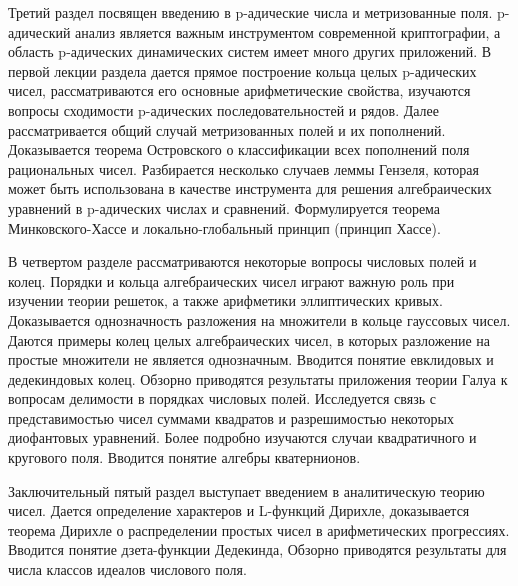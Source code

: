 \documentclass[a4paper, 12pt]{article}
\begin{document}
Третий раздел посвящен введению в p-адические числа и метризованные поля. p-адический анализ является важным инструментом современной криптографии, а область p-адических динамических систем имеет много других приложений. В первой лекции раздела дается прямое построение кольца целых p-адических чисел, рассматриваются его основные арифметические свойства, изучаются вопросы сходимости p-адических последовательностей и рядов. Далее рассматривается общий случай метризованных полей и их пополнений. Доказывается теорема Островского о классификации всех пополнений поля рациональных чисел. Разбирается несколько случаев леммы Гензеля, которая может быть использована в качестве инструмента для решения алгебраических уравнений в p-адических числах и сравнений. Формулируется теорема Минковского-Хассе и локально-глобальный принцип (принцип Хассе).

В четвертом разделе рассматриваются некоторые вопросы числовых полей и колец. Порядки и кольца алгебраических чисел играют важную роль при изучении теории решеток, а также арифметики эллиптических кривых. Доказывается однозначность разложения на множители в кольце гауссовых чисел. Даются примеры колец целых алгебраических чисел, в которых разложение на простые множители не является однозначным. Вводится понятие евклидовых и дедекиндовых колец. Обзорно приводятся результаты приложения теории Галуа к вопросам делимости в порядках числовых полей. Исследуется связь с представимостью чисел суммами квадратов и разрешимостью некоторых диофантовых уравнений. Более подробно изучаются случаи квадратичного и кругового поля. Вводится понятие алгебры кватернионов.

Заключительный пятый раздел выступает введением в аналитическую теорию чисел. Дается определение характеров и L-функций Дирихле, доказывается теорема Дирихле о распределении простых чисел в арифметических прогрессиях. Вводится понятие дзета-функции Дедекинда, Обзорно приводятся результаты для числа классов идеалов числового поля.

\vspace{8pt}
\end{document}
